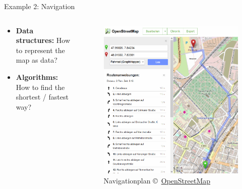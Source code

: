 \begin{frame}{Example 2: Navigation}
  \begin{columns}
    \begin{column}{0.55\textwidth}
      \begin{itemize}
        \item<2-|handout:1>
          \textbf{Data structures:} How to represent the map as data?
        \item<3-|handout:1>
          \textbf{Algorithms:} How to find the shortest / fastest way?
      \end{itemize}
    \end{column}%
    \begin{column}{0.45\textwidth}
      \begin{figure}[!h]
        \includegraphics[width=\textwidth]
          {Images/Introduction/OpenStreetmap.png}
        \caption{Navigationplan \copyright\,%
          \href{http://openstreetmap.org/}{OpenStreetMap}%
        }%
        \label{fig:openstreetmap}
      \end{figure}
    \end{column}
  \end{columns}
\end{frame}


